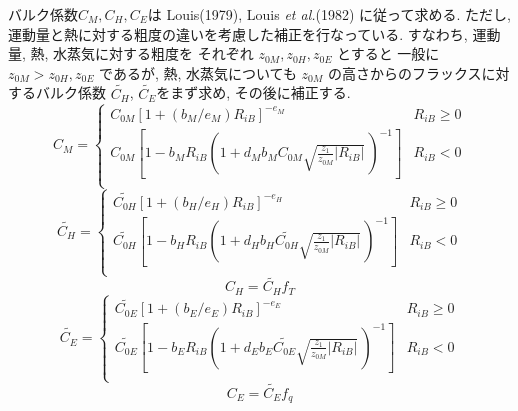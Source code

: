 バルク係数$C_M,C_H,C_E$は
Louis(1979), Louis {\em et al.}(1982) に従って求める. 
ただし, 運動量と熱に対する粗度の違いを考慮した補正を行なっている. 
すなわち, 運動量, 熱, 水蒸気に対する粗度を
それぞれ $z_{0M}, z_{0H}, z_{0E}$ とすると
一般に $z_{0M} > z_{0H}, z_{0E}$ であるが, 熱, 水蒸気についても
$z_{0M}$ の高さからのフラックスに対するバルク係数
$\widetilde{C_H}$, $\widetilde{C_E}$をまず求め, その後に補正する. 
%
\begin{equation}
C_M = \left\{ 
      \begin{array}{lr}
      C_{0M} [ 1 + (b_M/e_M) R_{iB} ]^{-e_M} 
         & R_{iB} \geq 0 \\
      C_{0M} \left[ 1 - b_M R_{iB} \left( 1+ d_M b_M C_{0M}
                                  \sqrt{\frac{z_1}{z_{0M}}| R_{iB}|} \,
                                  \right)^{-1} \right]      
         & R_{iB} < 0 \\
      \end{array} \right.
\end{equation}
%
\begin{equation}
\widetilde{C_H} = \left\{ 
      \begin{array}{lr}
      \widetilde{C_{0H}} [ 1 + (b_H/e_H) R_{iB} ]^{-e_H} 
         & R_{iB} \geq 0 \\
      \widetilde{C_{0H}} \left[ 1 - b_H R_{iB} 
                                  \left( 1+ d_H b_H \widetilde{C_{0H}}
                                  \sqrt{\frac{z_1}{z_{0M}}| R_{iB}|} \,
                                  \right)^{-1} \right]      
         & R_{iB} < 0 \\
      \end{array} \right.
\end{equation}
\begin{equation}
C_H = \widetilde{C_H} f_T 
\end{equation}
%
\begin{equation}
\widetilde{C_E} = \left\{ 
      \begin{array}{lr}
      \widetilde{C_{0E}} [ 1 + (b_E/e_E) R_{iB} ]^{-e_E} 
         & R_{iB} \geq 0 \\
      \widetilde{C_{0E}} \left[ 1 - b_E R_{iB} 
                                  \left( 1+ d_E b_E \widetilde{C_{0E}}
                                  \sqrt{\frac{z_1}{z_{0M}}| R_{iB}|} \,
                                  \right)^{-1} \right]      
         & R_{iB} < 0 \\
      \end{array} \right.
\end{equation}
\begin{equation}
C_E = \widetilde{C_E} f_q 
\end{equation}

